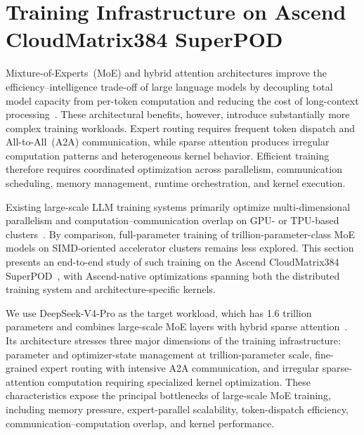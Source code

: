 \section{Training Infrastructure on Ascend CloudMatrix384 SuperPOD}\label{sec:train_infra}

Mixture-of-Experts~(MoE) and hybrid attention architectures improve the efficiency--intelligence trade-off of large language models by decoupling total model capacity from per-token computation and reducing the cost of long-context processing~\citep{krajewski2024scaling,deepseekai2026deepseekv4highlyefficientmilliontoken}. These architectural benefits, however, introduce substantially more complex training workloads. Expert routing requires frequent token dispatch and All-to-All~(A2A) communication, while sparse attention produces irregular computation patterns and heterogeneous kernel behavior. Efficient training therefore requires coordinated optimization across parallelism, communication scheduling, memory management, runtime orchestration, and kernel execution.

Existing large-scale LLM training systems primarily optimize multi-dimensional parallelism and computation--communication overlap on GPU- or TPU-based clusters~\citep{yan2026scalable}. By comparison, full-parameter training of trillion-parameter-class MoE models on SIMD-oriented accelerator clusters remains less explored. This section presents an end-to-end study of such training on the Ascend CloudMatrix384 SuperPOD~\citep{zuo2025serving}, with Ascend-native optimizations spanning both the distributed training system and architecture-specific kernels.

We use DeepSeek-V4-Pro as the target workload, which has 1.6 trillion parameters and combines large-scale MoE layers with hybrid sparse attention~\citep{deepseekai2026deepseekv4highlyefficientmilliontoken}. Its architecture stresses three major dimensions of the training infrastructure:  parameter and optimizer-state management at trillion-parameter scale,  fine-grained expert routing with intensive A2A communication, and  irregular sparse-attention computation requiring specialized kernel optimization. These characteristics expose the principal bottlenecks of large-scale MoE training, including memory pressure, expert-parallel scalability, token-dispatch efficiency, communication--computation overlap, and kernel performance. 

